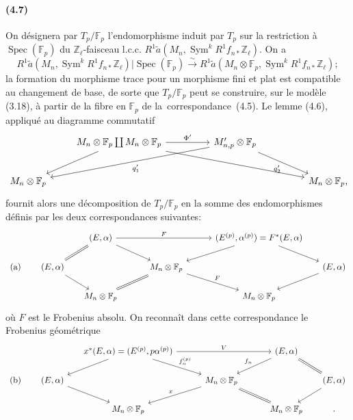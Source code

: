 \documentclass[10pt]{article}
\newcommand{\Z}{\mathbb Z}
\newcommand{\Sym}{\operatorname{Sym}}
\newcommand{\Spec}{\operatorname{Spec}}
\newcommand{\F}{\mathbb F}
\newcommand{\frquote}[1]{\guillemotleft{}\,#1\,\guillemotright{}}
\begin{document}
\paragraph{(4.7)}
On désignera par $T_p/\F_p$ l'endomorphisme induit par $T_p$ sur la restriction à $\Spec(\F_p)$ du $\Z_\ell$-faisceau l.c.c. $R^1\widetilde a(M_n,\Sym^kR^1f_{n*}\Z_\ell)$. On a
\[
R^1\widetilde a(M_n,\Sym^kR^1f_{n*}\Z_\ell)|\Spec(\F_p)
\xrightarrow{\sim}
R^1\widetilde a(M_n\otimes\F_p,\Sym^kR^1f_{n*}\Z_\ell);
\]
la formation du morphisme trace pour un morphisme fini et plat est compatible au changement de base, de sorte que $T_p/\F_p$ peut se construire, sur le modèle (3.18), à partir de la fibre en $\F_p$ de la \frquote{correspondance} (4.5). Le lemme (4.6), appliqué au diagramme commutatif
\[
\begin{tikzcd}[column sep=2.3em,row sep=2.25em]
& M_n\otimes\F_p\coprod M_n\otimes\F_p
  \arrow[rr,"\Phi'"]
  \arrow[dl]
  \arrow[drrrr]
&& M'_{n,p}\otimes\F_p
  \arrow[dlll,"q'_1"]
  \arrow[drr,"q'_2"'] & \\
M_n\otimes\F_p &&&&& M_n\otimes\F_p\rlap{,}
\end{tikzcd}
\]
fournit alors une décomposition de $T_p/\F_p$ en la somme des endomorphismes définis par les deux correspondances suivantes:
\[
\begin{tikzcd}[column sep=1.45em,row sep=1.65em]
&& (E,\alpha)
  \arrow[rrrr,"F"]
  \arrow[dl,equal]
  \arrow[drr]
&&&& (E^{(p)},\alpha^{(p)})=F^*(E,\alpha)
  \arrow[dll]
  \arrow[dr]
& \\
\textup{(a)} & (E,\alpha)
  \arrow[dr]
&&& M_n\otimes\F_p
  \arrow[dll,equal]
  \arrow[drr,"F"]
&&& (E,\alpha)
  \arrow[dl] \\
&& M_n\otimes\F_p &&&& M_n\otimes\F_p &
\end{tikzcd}
\]
où $F$ est le Frobenius absolu. On reconnaît dans cette correspondance le Frobenius géométrique
\[
\begin{tikzcd}[column sep=1.45em,row sep=1.65em]
&& x^*(E,\alpha)=(E^{(p)},p\alpha^{(p)})
  \arrow[rrrr,"V"]
  \arrow[dl]
  \arrow[drr,"f_n^{(p)}"]
&&&& (E,\alpha)
  \arrow[dll,"f_n"']
  \arrow[dr,equal]
& \\
\textup{(b)} & (E,\alpha)
  \arrow[dr]
&&& M_n\otimes\F_p
  \arrow[dll,"x"']
  \arrow[drr,equal]
&&& (E,\alpha)
  \arrow[dl] \\
&& M_n\otimes\F_p &&&& M_n\otimes\F_p & \text{.}
\end{tikzcd}
\]
\end{document}
